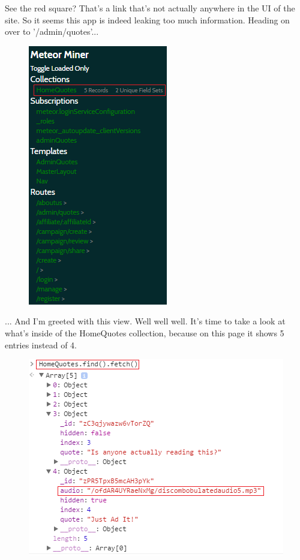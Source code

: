 \documentclass[writeup.tex]{subfiles}
\begin{document}
			See the red square? That's a link that's not actually anywhere in the UI of the site. So it seems this app is indeed leaking too much information. Heading on over to '/admin/quotes'...
			
			\begin{figure}[H]
				\centering
				\includegraphics[scale=1]{"screenshots/pwns/Site 4 - meteor miner2"}
			\end{figure}
			
			... And I'm greeted with this view. Well well well. It's time to take a look at what's inside of the HomeQuotes collection, because on this page it shows 5 entries instead of 4.
			
			\begin{figure}[H]
				\centering
				\includegraphics[scale=1]{"screenshots/pwns/Site 4 - meteor miner3"}
			\end{figure}
			
\end{document}
